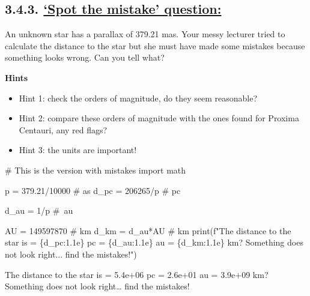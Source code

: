 \documentclass[
  letterpaper,
  DIV=11,
  numbers=noendperiod]{scrreprt}
\newenvironment{Shaded}{\begin{snugshade}}{\end{snugshade}}
\newcommand{\BuiltInTok}[1]{\textcolor[rgb]{0.00,0.23,0.31}{#1}}
\newcommand{\CommentTok}[1]{\textcolor[rgb]{0.37,0.37,0.37}{#1}}
\newcommand{\DecValTok}[1]{\textcolor[rgb]{0.68,0.00,0.00}{#1}}
\newcommand{\FloatTok}[1]{\textcolor[rgb]{0.68,0.00,0.00}{#1}}
\newcommand{\ImportTok}[1]{\textcolor[rgb]{0.00,0.46,0.62}{#1}}
\newcommand{\NormalTok}[1]{\textcolor[rgb]{0.00,0.23,0.31}{#1}}
\newcommand{\OperatorTok}[1]{\textcolor[rgb]{0.37,0.37,0.37}{#1}}
\newcommand{\SpecialCharTok}[1]{\textcolor[rgb]{0.37,0.37,0.37}{#1}}
\newcommand{\SpecialStringTok}[1]{\textcolor[rgb]{0.13,0.47,0.30}{#1}}
\providecommand{\tightlist}{%
  \setlength{\itemsep}{0pt}\setlength{\parskip}{0pt}}\usepackage{longtable,booktabs,array}
\begin{document}
\hypertarget{spot-the-mistake-question}{%
\subsection{\texorpdfstring{3.4.3. \protect\hyperlink{toc0_}{`Spot the
mistake'
question:}}{3.4.3. `Spot the mistake' question:}}\label{spot-the-mistake-question}}

An unknown star has a parallax of 379.21 mas. Your messy lecturer tried
to calculate the distance to the star but she must have made some
mistakes because something looks wrong. Can you tell what?

\textbf{Hints}

\begin{itemize}
\tightlist
\item
  Hint 1: check the orders of magnitude, do they seem reasonable?
\item
  Hint 2: compare these orders of magnitude with the ones found for
  Proxima Centauri, any red flags?
\item
  Hint 3: the units are important!
\end{itemize}

\begin{Shaded}
\begin{Highlighting}[]
\CommentTok{\# This is the version with mistakes}
\ImportTok{import}\NormalTok{ math}

\NormalTok{p }\OperatorTok{=} \FloatTok{379.21}\OperatorTok{/}\DecValTok{10000} \CommentTok{\# as }
\NormalTok{d\_pc }\OperatorTok{=} \DecValTok{206265}\OperatorTok{/}\NormalTok{p }\CommentTok{\# pc}

\NormalTok{d\_au }\OperatorTok{=} \DecValTok{1}\OperatorTok{/}\NormalTok{p }\CommentTok{\# au}

\NormalTok{AU }\OperatorTok{=} \DecValTok{149597870} \CommentTok{\# km}
\NormalTok{d\_km }\OperatorTok{=}\NormalTok{ d\_au}\OperatorTok{*}\NormalTok{AU }\CommentTok{\# km}
\BuiltInTok{print}\NormalTok{(}\SpecialStringTok{f"The distance to the star is = }\SpecialCharTok{\{}\NormalTok{d\_pc}\SpecialCharTok{:1.1e\}}\SpecialStringTok{ pc = }\SpecialCharTok{\{}\NormalTok{d\_au}\SpecialCharTok{:1.1e\}}\SpecialStringTok{ au = }\SpecialCharTok{\{}\NormalTok{d\_km}\SpecialCharTok{:1.1e\}}\SpecialStringTok{ km? Something does not look right... find the mistakes!"}\NormalTok{)}
\end{Highlighting}
\end{Shaded}

The distance to the star is = 5.4e+06 pc = 2.6e+01 au = 3.9e+09 km?
Something does not look right\ldots{} find the mistakes!
\end{document}
